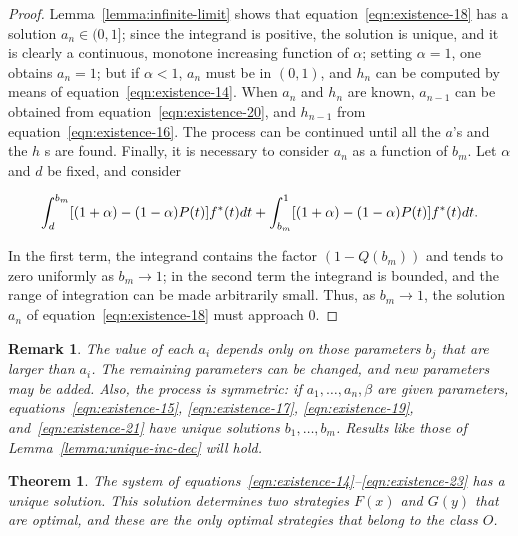\documentclass{article}
\newtheorem{theorem}{Theorem}
\newtheorem{remark}{Remark}
\begin{document}
\begin{proof}

Lemma~\ref{lemma:infinite-limit} shows that equation~\ref{eqn:existence-18} has
a solution $a_n \in (0, 1]$; since the integrand is positive, the solution is
unique, and it is clearly a continuous, monotone increasing function of
$\alpha$; setting $\alpha = 1$, one obtains $a_n = 1$; but if $\alpha < 1$,
$a_n$ must be in $(0, 1)$, and $h_n$ can be computed by means of
equation~\ref{eqn:existence-14}. When $a_n$ and $h_n$ are known, $a_{n-1}$ can
be obtained from equation~\ref{eqn:existence-20}, and $h_{n-1}$ from
equation~\ref{eqn:existence-16}. The process can be continued until all the
$a$'s and the $h$
s are found. Finally, it is necessary to consider $a_n$ as a function of $b_m$.
Let $\alpha$ and $d$ be fixed, and consider

\[
\int_{d}^{b_m} [(1 + \alpha) - (1 - \alpha) P(t)] f^*(t) dt \\
+ \int_{b_m}^{1} [(1 + \alpha) - (1 - \alpha) P(t)] f^*(t) dt.
\]

In the first term, the integrand contains the factor $(1 - Q(b_m))$ and tends
to zero uniformly as $b_m \to 1$; in the second term the integrand is bounded,
and the range of integration can be made arbitrarily small. Thus, as $b_m \to
1$, the solution $a_n$ of equation~\ref{eqn:existence-18} must approach $0$.

\end{proof}

\begin{remark}

The value of each $a_i$ depends only on those parameters $b_j$ that are larger
than $a_i$. The remaining parameters can be changed, and new parameters may be
added. Also, the process is symmetric: if $a_1, \dots, a_n, \beta$ are given
parameters, equations~\ref{eqn:existence-15}, \ref{eqn:existence-17},
\ref{eqn:existence-19}, and~\ref{eqn:existence-21} have unique solutions $b_1,
\dots, b_m$. Results like those of Lemma~\ref{lemma:unique-inc-dec} will hold.

\end{remark}

\begin{theorem}

The system of equations~\ref{eqn:existence-14}--\ref{eqn:existence-23} has a
unique solution. This solution determines two strategies $F(x)$ and $G(y)$ that
are optimal, and these are the only optimal strategies that belong to the class
$O$.

\end{theorem}
\end{document}
